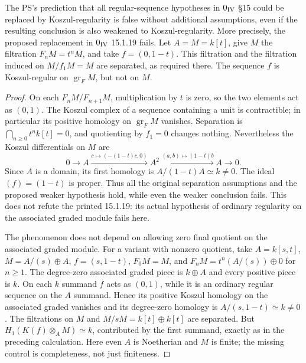 \begin{example}\label{SA23-C-9}
The PS's prediction that all regular-sequence hypotheses in
$0_{\rm IV}$ \S15 could be replaced by Koszul-regularity is false
without additional assumptions, even if the resulting conclusion
is also weakened to Koszul-regularity.  More precisely, the proposed
replacement in $0_{\rm IV}$ 15.1.19 fails.
\cite[15.1.19, p.~19]{algEGAIV1}
Let $A=M=k[t]$, give $M$ the filtration $F_nM=t^nM$, and take
$f=(0,1-t)$.  This filtration and the filtration induced on
$M/f_1M=M$ are separated, as required there.  The sequence $f$
is Koszul-regular on $\operatorname{gr}_F M$, but not on $M$.
\end{example}
\begin{proof}
On each $F_nM/F_{n+1}M$, multiplication by $t$ is zero, so the
two elements act as $(0,1)$.  The Koszul complex of a sequence
containing a unit is contractible; in particular its positive
homology on $\operatorname{gr}_F M$ vanishes.  Separation is
$\bigcap_{n\geq0}t^nk[t]=0$, and quotienting by $f_1=0$ changes
nothing.  Nevertheless the Koszul differentials on $M$ are
\[
 0\longrightarrow A
 \xrightarrow{c\mapsto(-(1-t)c,0)}
 A^2
 \xrightarrow{(a,b)\mapsto(1-t)b}
 A\longrightarrow0.
\]
Since $A$ is a domain, its first homology is
$A/(1-t)A\simeq k\ne0$.  The ideal $(f)=(1-t)$ is proper.
Thus all the original separation assumptions and the proposed
weaker hypothesis hold, while even the weaker conclusion fails.
This does not refute the printed 15.1.19: its actual hypothesis of
ordinary regularity on the associated graded module fails here.

The phenomenon does not depend on allowing zero final quotient
on the associated graded module.  For a variant with nonzero
quotient, take $A=k[s,t]$, $M=A/(s)\oplus A$, $f=(s,1-t)$,
$F_0M=M$, and
$F_nM=t^n(A/(s))\oplus0$ for $n\geq1$.
The degree-zero associated graded piece is $k\oplus A$ and
every positive piece is $k$.  On each $k$ summand $f$ acts as
$(0,1)$, while it is an ordinary regular sequence on the $A$
summand.  Hence its positive Koszul homology on the associated
graded vanishes and its degree-zero homology is
$A/(s,1-t)\simeq k\ne0$.  The filtrations on $M$ and
$M/sM=k[t]\oplus k[t]$ are separated.  But
$H_1(K(f)\otimes_A M)\simeq k$, contributed by the first
summand, exactly as in the preceding calculation.  Here even
$A$ is Noetherian and $M$ is finite; the missing control is
completeness, not just finiteness.


\end{proof}
